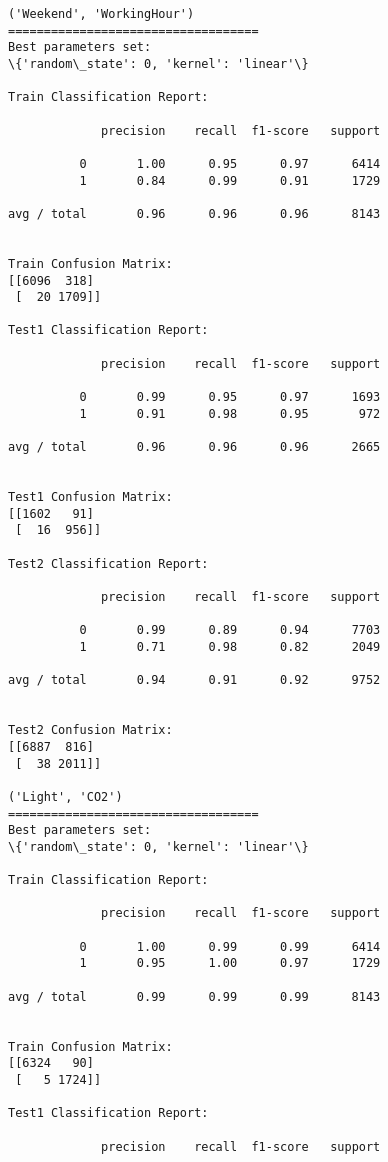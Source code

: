 \documentclass[11pt]{article}
\begin{document}
    \begin{Verbatim}[commandchars=\\\{\}]
('Weekend', 'WorkingHour')
===================================
Best parameters set:
\{'random\_state': 0, 'kernel': 'linear'\}

Train Classification Report:

             precision    recall  f1-score   support

          0       1.00      0.95      0.97      6414
          1       0.84      0.99      0.91      1729

avg / total       0.96      0.96      0.96      8143


Train Confusion Matrix:
[[6096  318]
 [  20 1709]]

Test1 Classification Report:

             precision    recall  f1-score   support

          0       0.99      0.95      0.97      1693
          1       0.91      0.98      0.95       972

avg / total       0.96      0.96      0.96      2665


Test1 Confusion Matrix:
[[1602   91]
 [  16  956]]

Test2 Classification Report:

             precision    recall  f1-score   support

          0       0.99      0.89      0.94      7703
          1       0.71      0.98      0.82      2049

avg / total       0.94      0.91      0.92      9752


Test2 Confusion Matrix:
[[6887  816]
 [  38 2011]]

('Light', 'CO2')
===================================
Best parameters set:
\{'random\_state': 0, 'kernel': 'linear'\}

Train Classification Report:

             precision    recall  f1-score   support

          0       1.00      0.99      0.99      6414
          1       0.95      1.00      0.97      1729

avg / total       0.99      0.99      0.99      8143


Train Confusion Matrix:
[[6324   90]
 [   5 1724]]

Test1 Classification Report:

             precision    recall  f1-score   support


\end{Verbatim}
\end{document}

